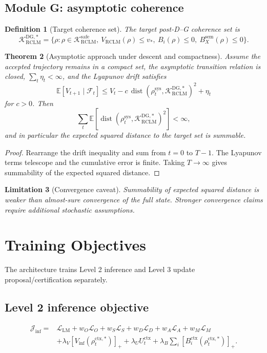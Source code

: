 \documentclass[11pt,a4paper]{article}
\newtheorem{theorem}{Theorem}[section]
\newtheorem{definition}[theorem]{Definition}
\newtheorem{limitation}[theorem]{Limitation}
\newcommand{\Kcal}{\mathcal K}
\newcommand{\Fcal}{\mathcal F}
\newcommand{\RCLM}{\mathrm{RCLM}}
\newcommand{\DG}{\mathrm{DG}}
\newcommand{\sem}{\mathrm{sem}}
\newcommand{\sys}{\mathrm{sys}}
\newcommand{\ctx}{\mathrm{ctx}}
\newcommand{\safe}{\mathrm{safe}}
\newcommand{\dist}{\operatorname{dist}}
\newcommand{\LM}{\mathrm{LM}}
\begin{document}
\subsection{Module G: asymptotic coherence}

\begin{definition}[Target coherence set]
The target post-D--G coherence set is
\[
\Kcal_{\RCLM}^{\DG,*}
=
\{\rho:\rho\in\Kcal_{\RCLM}^{\safe},\ V_{\RCLM}(\rho)\le v_*,\ B_i(\rho)\le0,\ B_X^{\sem}(\rho)\le0\}.
\]
\end{definition}

\begin{theorem}[Asymptotic approach under descent and compactness]
Assume the accepted trajectory remains in a compact set, the asymptotic transition relation is closed, \(\sum_t\eta_t<\infty\), and the Lyapunov drift satisfies
\[
\mathbb E[V_{t+1}\mid\Fcal_t]
\le V_t-c\,\dist(\rho_t^{\sys},\Kcal_{\RCLM}^{\DG,*})^2+\eta_t
\]
for \(c>0\). Then
\[
\sum_t\mathbb E[\dist(\rho_t^{\sys},\Kcal_{\RCLM}^{\DG,*})^2]<\infty,
\]
and in particular the expected squared distance to the target set is summable.
\end{theorem}

\begin{proof}
Rearrange the drift inequality and sum from \(t=0\) to \(T-1\). The Lyapunov terms telescope and the cumulative error is finite. Taking \(T\to\infty\) gives summability of the expected squared distance.
\end{proof}

\begin{limitation}[Convergence caveat]
Summability of expected squared distance is weaker than almost-sure convergence of the full state. Stronger convergence claims require additional stochastic assumptions.
\end{limitation}

\section{Training Objectives}

The architecture trains Level 2 inference and Level 3 update proposal/certification separately.

\subsection{Level 2 inference objective}

\[
\begin{aligned}
\mathcal J_{\mathrm{inf}}
={}&
\mathcal L_{\LM}
+w_O\mathcal L_O
+w_S\mathcal L_S
+w_D\mathcal L_D
+w_A\mathcal L_A
+w_M\mathcal L_M\\
&+\lambda_V[V_{\mathrm{inf}}(\rho_t^{\ctx,*})]_+
+\lambda_U U_t^{\ctx}
+\lambda_B\sum_i[B_i^{\ctx}(\rho_t^{\ctx,*})]_+.
\end{aligned}
\]
\end{document}
